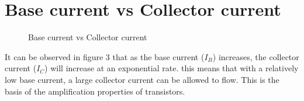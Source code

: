 \documentclass[a4paper,11pt]{article}
\begin{document}
\section{Base current vs Collector current}

\begin{figure}[h]
 \begin{center}
  \vspace{-8pt}
  \caption{Base current vs Collector current}
 \end{center}
\end{figure}

It can be observed in figure 3 that as the base current ($I_B$) increases, the collector current ($I_C$) will increase at an exponential rate. this means that with a relatively low base current, a large collector current can be allowed to flow. This is the basis of the amplification properties of transistors. 
\end{document}
